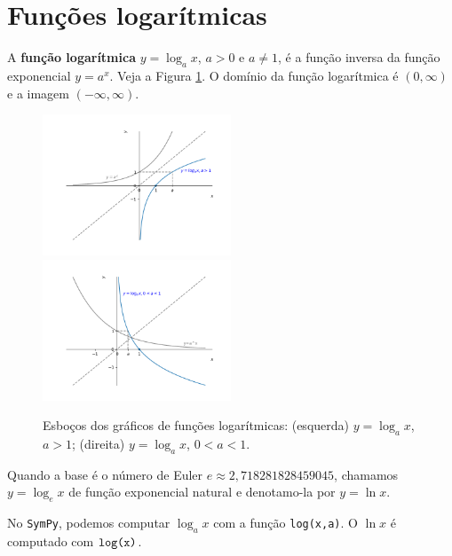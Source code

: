 \section{Funções logarítmicas}\label{cap_funcao_sec_funlog}

A {\bf função logarítmica} $y = \log_a x$, $a>0$ e $a\neq 1$, é a função inversa da função exponencial $y = a^x$. Veja a Figura \ref{fig:log_graficos}. O domínio da função logarítmica é $(0,\infty)$ e a imagem $(-\infty, \infty)$.

\begin{figure}[H]
  \centering
  \includegraphics[width=0.5\textwidth]{./cap_funcao/dados/fig_log_graficos/fig_log_2}~
  \includegraphics[width=0.5\textwidth]{./cap_funcao/dados/fig_log_graficos/fig_log_12}
  \caption{Esboços dos gráficos de funções logarítmicas: (esquerda) $y = \log_a x$, $a>1$; (direita) $y = \log_a x$, $0<a<1$.}
  \label{fig:log_graficos}
\end{figure}

\begin{obs}
  Quando a base é o número de Euler $e \approx 2,718281828459045$, chamamos $y = \log_e x$ de função exponencial natural e denotamo-la por $y = \ln x$.

  \ifispython
  No \verb+SymPy+, podemos computar $\log_a x$ com a função \verb+log(x,a)+. O $\ln x$ é computado com $\verb+log(x)+$.
  \fi
\end{obs}

